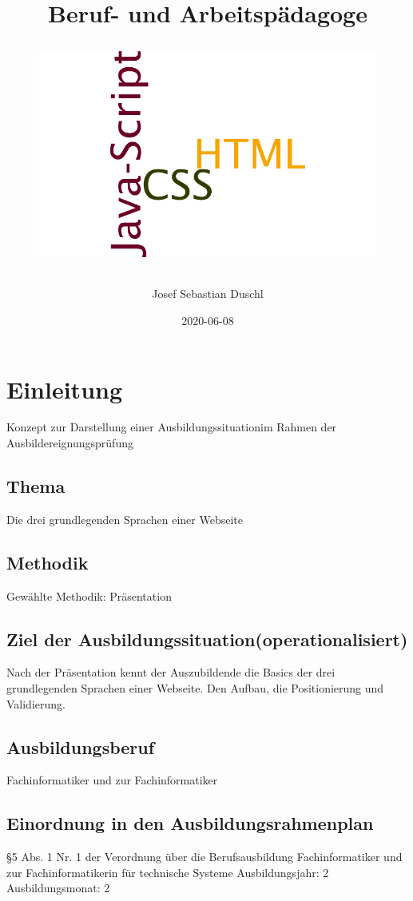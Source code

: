 \documentclass{article}
\title{
	Beruf- und Arbeitspädagoge\\
	 \thema
	\newline
	\begin{figure}[h!]
		\vspace{15mm}
	\includegraphics[scale=0.2, width=\linewidth]{./pics/htmlCssJsWordwordle.png}
\end{figure}
	\vfill
}
\author{
	Josef Sebastian Duschl
}
\date{2020-06-08}
\newcommand{\thema}{Die drei grundlegenden Sprachen einer Webseite}
\begin{document}


    \maketitle
    \newpage

    \tableofcontents %
    \newpage

	\section{Einleitung}
	Konzept zur Darstellung einer Ausbildungssituationim Rahmen der Ausbildereignungsprüfung
	\subsection{Thema}
	\thema

    \subsection{Methodik}
        Gewählte Methodik: Präsentation
     
    \subsection{Ziel der Ausbildungssituation(operationalisiert)}     
        Nach der Präsentation kennt der Auszubildende die Basics der drei grundlegenden Sprachen einer Webseite. Den Aufbau, die Positionierung und Validierung.
        
    \subsection{Ausbildungsberuf}
    Fachinformatiker und zur Fachinformatiker
    
    \subsection{Einordnung in den Ausbildungsrahmenplan}
    §5 Abs. 1 Nr. 1 der Verordnung über die Berufsausbildung  Fachinformatiker und zur Fachinformatikerin für technische Systeme
    \newline
    Ausbildungsjahr: 2\\
    Ausbildungsmonat: 2\\
   
\end{document}
